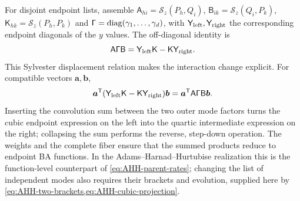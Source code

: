 For disjoint endpoint lists, assemble
$\mathsf A_{hi}=\mathscr S_z(P_h,Q_i)$,
$\mathsf B_{ik}=\mathscr S_z(Q_i,P_k)$,
$\mathsf K_{hk}=\mathscr S_z(P_h,P_k)$ and
$\mathsf\Gamma=\operatorname{diag}(\gamma_1,\ldots,\gamma_d)$, with
$\mathsf Y_{\rm left},\mathsf Y_{\rm right}$ the corresponding
endpoint diagonals of the $y$ values. The off-diagonal identity is
\begin{equation}\label{eq:AHH-Sylvester}
 \mathsf A\mathsf\Gamma\mathsf B
   =\mathsf Y_{\rm left}\mathsf K-\mathsf K\mathsf Y_{\rm right}.
\end{equation}
This Sylvester displacement relation makes the interaction change
explicit. For compatible vectors $\boldsymbol a,\boldsymbol b$,
\[
 \boldsymbol a^{\mathsf T}
 (\mathsf Y_{\rm left}\mathsf K-\mathsf K\mathsf Y_{\rm right})
 \boldsymbol b
 =\boldsymbol a^{\mathsf T}\mathsf A\mathsf\Gamma\mathsf B\boldsymbol b.
\]
Inserting the convolution sum between the two outer mode factors
turns the cubic endpoint expression on the left into the quartic
intermediate expression on the right; collapsing the sum performs
the reverse, step-down operation. The weights and the complete fiber
ensure that the summed products reduce to endpoint BA functions. In the
Adams--Harnad--Hurtubise realization this is the function-level counterpart of
\cref{eq:AHH-parent-rates}; changing the list of independent modes
also requires their brackets and evolution, supplied here by
\cref{eq:AHH-two-brackets,eq:AHH-cubic-projection}.
